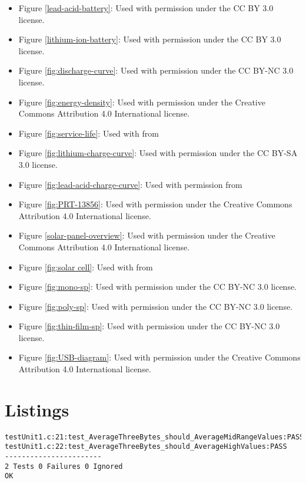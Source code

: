 \begin{itemize}
\item Figure \ref{lead-acid-battery}: Used with permission under the CC BY 3.0 license. \cite{lead-acid-battery}
\item Figure \ref{lithium-ion-battery}: Used with permission under the CC BY 3.0 license. \cite{lithium-ion-battery}
\item Figure \ref{fig:discharge-curve}: Used with permission under the CC BY-NC 3.0 license. \cite{discharge-curve}
\item Figure \ref{fig:energy-density}: Used with permission under the Creative Commons Attribution 4.0 International license. \cite{energy-density}
\item Figure \ref{fig:service-life}: Used with from
\item Figure \ref{fig:lithium-charge-curve}: Used with permission under the CC BY-SA 3.0 license. \cite{lithium-charge-curve}
\item Figure \ref{fig:lead-acid-charge-curve}: Used with permission from
\item Figure \ref{fig:PRT-13856}: Used with permission under the Creative Commons Attribution 4.0 International license. \cite{PRT-13856}
\item Figure \ref{solar-panel-overview}: Used with permission under the Creative Commons Attribution 4.0 International license. \cite{solar-panel-overview}
\item Figure \ref{fig:solar cell}: Used with from
\item Figure \ref{fig:mono-sp}: Used with permission under the CC BY-NC 3.0 license. \cite{mono-sp}
\item Figure \ref{fig:poly-sp}: Used with permission under the CC BY-NC 3.0 license. \cite{poly-sp}
\item Figure \ref{fig:thin-film-sp}: Used with permission under the CC BY-NC 3.0 license. \cite{thin-film-sp}
\item Figure \ref{fig:USB-diagram}: Used with permission under the Creative Commons Attribution 4.0 International license. \cite{USB-diagram}

\end{itemize}

\newpage
\section{Listings}
\renewcommand{\lstlistlistingname}{}
\lstlistoflistings
\hfill

\begin{lstlisting}[label={lst:unity-report}, caption=Example Unity Test Report Output \cite{unity-homepage}]
testUnit1.c:21:test_AverageThreeBytes_should_AverageMidRangeValues:PASS
testUnit1.c:22:test_AverageThreeBytes_should_AverageHighValues:PASS
-----------------------
2 Tests 0 Failures 0 Ignored
OK
\end{lstlisting}

